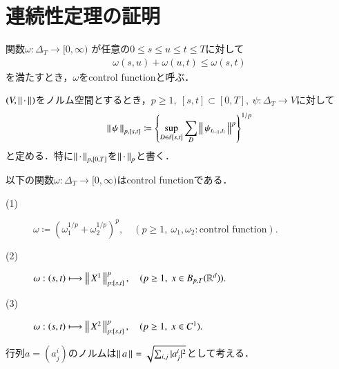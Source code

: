 \section{連続性定理の証明}
	\begin{screen}
		\begin{dfn}
			関数$\omega:\Delta_T \longrightarrow [0,\infty)$
			が任意の$0 \leq s \leq u \leq t \leq T$に対して
			\begin{align}
				\omega(s,u) + \omega(u,t) \leq \omega(s,t)
				\label{eq:control_function_subadditivity}
			\end{align}
			を満たすとき，$\omega$をcontrol functionと呼ぶ．
		\end{dfn}
	\end{screen}
	
	\begin{screen}
		\begin{dfn}
			$(V,\left\|\, \cdot\, \right\|_{})$をノルム空間とするとき，$p \geq 1,\ [s,t] \subset [0,T]
			,\ \psi:\Delta_T \longrightarrow V$に対して
			\begin{align}
				\left\|\, \psi\, \right\|_{p,[s,t]}
				\coloneqq \left\{ \operatorname*{sup}_{D \in \delta[s,t]}  \sum_D \left\|\, \psi_{t_{i-1},t_i}\, \right\|_{}^p \right\}^{1/p}
			\end{align}
			と定める．特に$\left\|\, \cdot\, \right\|_{p,[0,T]}$を$\left\|\, \cdot\, \right\|_{p}$と書く．
		\end{dfn}
	\end{screen}
	
	\begin{screen}
		\begin{thm}
			以下の関数$\omega:\Delta_T \longrightarrow [0,\infty)$はcontrol functionである．
			\begin{description}
				\item[(1)] $\omega \coloneqq \left( \omega_1^{1/p} + \omega_2^{1/p} \right)^p,
					\quad (p \geq 1,\ \omega_1,\omega_2:\mbox{control function}).$
				\item[(2)] $\omega:(s,t) \longmapsto \left\|\, X^1\, \right\|_{p:[s,t]}^p,
					\quad (p \geq 1,\ x \in B_{p,T}(\mathbb{R}^d)).$
				\item[(3)] $\omega:(s,t) \longmapsto \left\|\, X^2\, \right\|_{p:[s,t]}^p,
					\quad (p \geq 1,\ x \in C^1).$
			\end{description}
		\end{thm}
	\end{screen}
	
	行列$a = (a_j^i)$のノルムは$\left\|\, a\, \right\|_{} = \sqrt{\sum_{i,j}|a_j^i|^2}$として考える．
	
